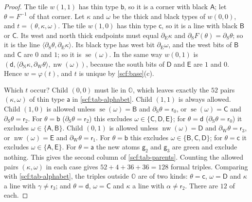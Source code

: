 \begin{proof}
The tile $w(1,1)$ has thin type $\mathsf b$, so it is a corner with black $\mathsf A$; let $\theta=F^{-1}$ of that corner. Let $\kappa$ and $\omega$ be the thick and black types of $w(0,0)$, and $t=(\theta,\kappa,\omega)$. The tile $w(1,0)$ has thin type $\mathsf c$, so it is a line with black $\mathsf B$ or $\mathsf C$. Its west and north thick endpoints must equal $\partial_{\mathrm E}\kappa$ and $\partial_{\mathrm S}F(\theta)=\partial_{\mathrm S}\theta$; so it is the line $\langle\partial_{\mathrm S}\theta,\partial_{\mathrm E}\kappa\rangle$. Its black type has west bit $\partial_{\mathrm E}\omega$, and the west bits of $\mathsf B$ and $\mathsf C$ are $0$ and $1$; so it is $\operatorname{se}(\omega)$. In the same way $w(0,1)$ is $(\mathsf d,\langle\partial_{\mathrm N}\kappa,\partial_{\mathrm W}\theta\rangle,\operatorname{nw}(\omega))$, because the south bits of $\mathsf D$ and $\mathsf E$ are $1$ and $0$. Hence $w=\varphi(t)$, and $t$ is unique by \cref{scf:base}(c).

Which $t$ occur? Child $(0,0)$ must lie in $\mathbb O$, which leaves exactly the $52$ pairs $(\kappa,\omega)$ of thin type $\mathsf a$ in \cref{scf:tab-alphabet}. Child $(1,1)$ is always allowed. Child $(1,0)$ is allowed unless $\operatorname{se}(\omega)=\mathsf B$ and $\partial_{\mathrm S}\theta=\mathsf r_0$, or $\operatorname{se}(\omega)=\mathsf C$ and $\partial_{\mathrm S}\theta=\mathsf r_2$. For $\theta=\mathsf b$ ($\partial_{\mathrm S}\theta=\mathsf r_2$) this excludes $\omega\in\{\mathsf C,\mathsf D,\mathsf E\}$; for $\theta=\mathsf d$ ($\partial_{\mathrm S}\theta=\mathsf r_0$) it excludes $\omega\in\{\mathsf A,\mathsf B\}$. Child $(0,1)$ is allowed unless $\operatorname{nw}(\omega)=\mathsf D$ and $\partial_{\mathrm W}\theta=\mathsf r_3$, or $\operatorname{nw}(\omega)=\mathsf E$ and $\partial_{\mathrm W}\theta=\mathsf r_1$. For $\theta=\mathsf b$ this excludes $\omega\in\{\mathsf B,\mathsf C,\mathsf D\}$; for $\theta=\mathsf c$ it excludes $\omega\in\{\mathsf A,\mathsf E\}$. For $\theta=\mathsf a$ the new atoms $\mathsf g_2$ and $\mathsf g_3$ are green and exclude nothing. This gives the second column of \cref{scf:tab-parents}. Counting the allowed pairs $(\kappa,\omega)$ in each case gives $52+4+36+36=128$ formal triples. Comparing with \cref{scf:tab-alphabet}, the triples outside $\mathbb O$ are of two kinds: $\theta=\mathsf c$, $\omega=\mathsf D$ and $\kappa$ a line with $\gamma\ne\mathsf r_3$; and $\theta=\mathsf d$, $\omega=\mathsf C$ and $\kappa$ a line with $\alpha\ne\mathsf r_2$. There are $12$ of each.


\end{proof}
